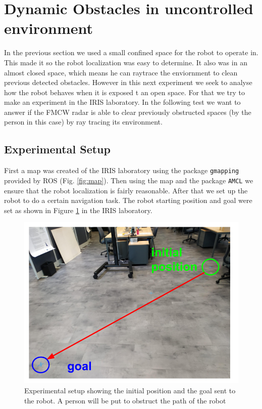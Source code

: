 \section {Dynamic Obstacles in uncontrolled environment}
In the previous section we used a small confined space for the robot to operate in. This made it so the robot localization was easy to determine. It also was in an almost closed space, which means he can raytrace the enviornment to clean previous detected obstacles. However in this next experiment we seek to analyse how the robot behaves when it is exposed t an open space. For that we try to make an experiment in the \ac{IRIS} laboratory.
In the following test we want to answer  if the \ac{FMCW} \ac{radar} is  able to clear previously obstructed spaces (by the person in this case) by ray tracing its environment. 
\subsection{Experimental Setup}
First a map was created of the \ac{IRIS} laboratory using the package \texttt{gmapping} provided by \ac{ROS} (Fig. \ref{fig:map}). Then using the map and the package \texttt{\ac{AMCL}} we ensure that the robot localization is fairly reasonable. After that we set up the robot to do a certain navigation task.
The robot starting position and goal were set as shown in Figure \ref{fig:setup} in the \ac{IRIS} laboratory. 

\begin{figure}[ht!]
\centerline{\includegraphics [width=0.8 \textwidth]{imgs/chapter5/setup.png}}
\caption[Experimental setup]{Experimental setup showing the initial position and the goal sent to the robot. A person will be put to obstruct the path of the robot}
\label{fig:setup}
\end{figure}


